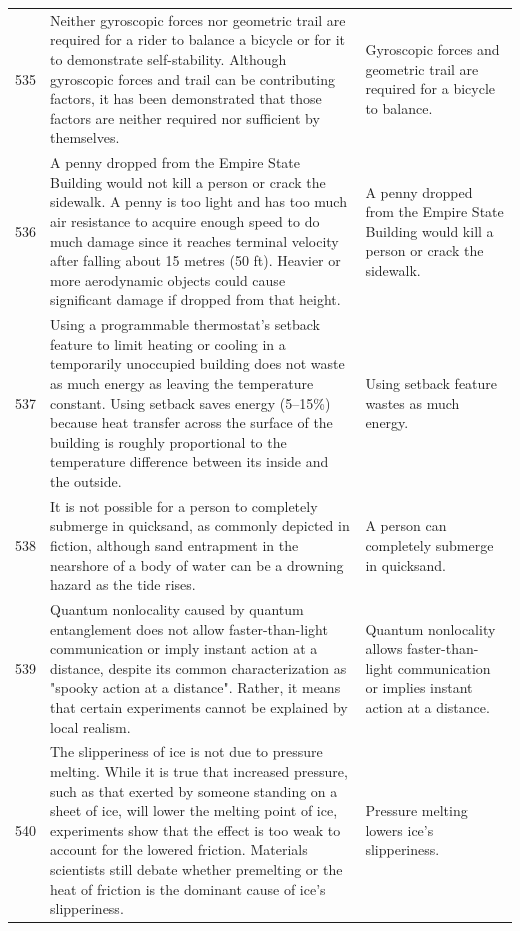 \begin{tabular}{c|p{}|p{}}
535 & Neither gyroscopic forces nor geometric trail are required for a rider to balance a bicycle or for it to demonstrate self-stability. Although gyroscopic forces and trail can be contributing factors, it has been demonstrated that those factors are neither required nor sufficient by themselves. & Gyroscopic forces and geometric trail are required for a bicycle to balance. \\
536 & A penny dropped from the Empire State Building would not kill a person or crack the sidewalk. A penny is too light and has too much air resistance to acquire enough speed to do much damage since it reaches terminal velocity after falling about 15 metres (50 ft). Heavier or more aerodynamic objects could cause significant damage if dropped from that height. & A penny dropped from the Empire State Building would kill a person or crack the sidewalk. \\
537 & Using a programmable thermostat's setback feature to limit heating or cooling in a temporarily unoccupied building does not waste as much energy as leaving the temperature constant. Using setback saves energy (5–15\%) because heat transfer across the surface of the building is roughly proportional to the temperature difference between its inside and the outside. & Using setback feature wastes as much energy. \\
538 & It is not possible for a person to completely submerge in quicksand, as commonly depicted in fiction, although sand entrapment in the nearshore of a body of water can be a drowning hazard as the tide rises. & A person can completely submerge in quicksand. \\
539 & Quantum nonlocality caused by quantum entanglement does not allow faster-than-light communication or imply instant action at a distance, despite its common characterization as "spooky action at a distance". Rather, it means that certain experiments cannot be explained by local realism. & Quantum nonlocality allows faster-than-light communication or implies instant action at a distance. \\
540 & The slipperiness of ice is not due to pressure melting. While it is true that increased pressure, such as that exerted by someone standing on a sheet of ice, will lower the melting point of ice, experiments show that the effect is too weak to account for the lowered friction. Materials scientists still debate whether premelting or the heat of friction is the dominant cause of ice's slipperiness. & Pressure melting lowers ice's slipperiness. \\

\end{tabular}
